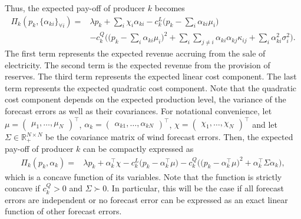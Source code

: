 \documentclass{article}
\begin{document}
Thus, the expected pay-off of producer $k$ becomes
\begin{align*}
\Pi_k(p_k, \{\alpha_{ki}\}_{\forall i}) =& \lambda p_k + \sum_i \chi_i \alpha_{ki} - c_k^L\Big(p_k - \sum_i \alpha_{ki} \mu_i\Big)\\
&- c_k^Q \Big(\big(p_k - \sum_i \alpha_{ki} \mu_i\big)^2 + \sum_i \sum_{j \ne i} \alpha_{ki} \alpha_{kj}  \kappa_{ij} + \sum_i \alpha_{ki}^2 \sigma_i^2\Big).
\end{align*}
The first term represents the expected revenue accruing from the sale of electricity. The second term is the expected revenue from the provision of reserves. The third term represents the expected linear cost component. The last term represents the expected quadratic cost component. Note that the quadratic cost component depends on the expected production level, the variance of the forecast errors as well as their covariances. For notational convenience, let $\mu = \begin{pmatrix} \mu_1, \ldots, \mu_N \end{pmatrix}^\top$, $\alpha_k = \begin{pmatrix} \alpha_{k1}, \ldots, \alpha_{kN} \end{pmatrix}^\top$, $\chi = \begin{pmatrix} \chi_1, \ldots, \chi_N \end{pmatrix}^\top$ and let $\Sigma \in \mathbb{R}_+^{N \times N}$ be the covariance matrix of wind forecast errors. Then, the expected pay-off of producer $k$ can be compactly expressed as
\begin{align*}
\Pi_k(p_k, \alpha_k) =& \lambda p_k + \alpha_k^\top \chi - c_k^L\big(p_k - \alpha_k^\top \mu\big) - c_k^Q \Big(\big(p_k - \alpha_{k}^\top \mu \big)^2 + \alpha_k^\top \Sigma \alpha_k\Big),
\end{align*}
which is a concave function of its variables. Note that the function is strictly concave if $c_k^Q > 0$ and $\Sigma \succ 0$. In particular, this will be the case if all forecast errors are independent or no forecast error can be expressed as an exact linear function of other forecast errors.
\end{document}
